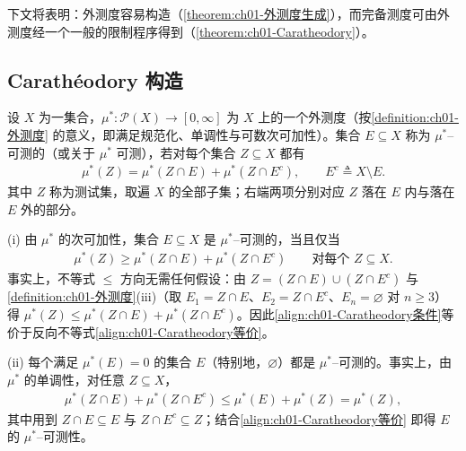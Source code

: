 \documentclass[../../main.tex]{subfiles}%
\begin{document}
下文将表明：外测度容易构造（\cref{theorem:ch01-外测度生成}），而完备测度可由外测度经一个一般的限制程序得到（\cref{theorem:ch01-Caratheodory}）。

\subsection{Carathéodory 构造}\label{subsection:ch01-Caratheodory构造}

\begin{definition}[$\mu^*$--可测集]\label{definition:ch01-外测度可测}
设 $X$ 为一集合，$\mu^*:\mathcal{P}(X)\to[0,\infty]$ 为 $X$ 上的一个外测度（按\cref{definition:ch01-外测度} 的意义，即满足规范化、单调性与可数次可加性）。集合 $E\subseteq X$ 称为 $\mu^*$--可测的（或关于 $\mu^*$ 可测），若对每个集合 $Z\subseteq X$ 都有
\begin{align}
\mu^*(Z)=\mu^*(Z\cap E)+\mu^*(Z\cap E^c),\qquad E^c\triangleq X\setminus E.\label{align:ch01-Caratheodory条件}
\end{align}
其中 $Z$ 称为测试集，取遍 $X$ 的全部子集；右端两项分别对应 $Z$ 落在 $E$ 内与落在 $E$ 外的部分。
\end{definition}

\begin{remark}\label{remark:ch01-外测度可测}
(i) 由 $\mu^*$ 的次可加性，集合 $E\subseteq X$ 是 $\mu^*$--可测的，当且仅当
\begin{align}
\mu^*(Z)\geqslant\mu^*(Z\cap E)+\mu^*(Z\cap E^c)\qquad\text{对每个 }Z\subseteq X.\label{align:ch01-Caratheodory等价}
\end{align}
事实上，不等式 $\leqslant$ 方向无需任何假设：由 $Z=(Z\cap E)\cup(Z\cap E^c)$ 与\cref{definition:ch01-外测度}(iii)（取 $E_1=Z\cap E$、$E_2=Z\cap E^c$、$E_n=\varnothing $ 对 $n\geqslant 3$）得 $\mu^*(Z)\leqslant\mu^*(Z\cap E)+\mu^*(Z\cap E^c)$。因此\eqref{align:ch01-Caratheodory条件}等价于反向不等式\eqref{align:ch01-Caratheodory等价}。

(ii) 每个满足 $\mu^*(E)=0$ 的集合 $E$（特别地，$\varnothing$）都是 $\mu^*$--可测的。事实上，由 $\mu^*$ 的单调性，对任意 $Z\subseteq X$，
\begin{align*}
\mu^*(Z\cap E)+\mu^*(Z\cap E^c)\leqslant\mu^*(E)+\mu^*(Z)=\mu^*(Z),
\end{align*}
其中用到 $Z\cap E\subseteq E$ 与 $Z\cap E^c\subseteq Z$；结合\eqref{align:ch01-Caratheodory等价} 即得 $E$ 的 $\mu^*$--可测性。
\end{remark}
\end{document}
